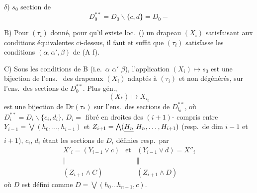 \documentclass[11pt,a4paper]{article}
\begin{document}
$\delta$) $s_0$ section de \struck{\ill{}}
\[
D_0^{**} = D_0 \smallsetminus \{c, d\} = D_0 - {}
\]
\ill{}


B) Pour $(\tau_i)$ donné, pour qu'il existe loc.\ (\ill{}) un drapeau $(X_i)$ satisfaisant aux conditions équivalentes ci-dessus, il faut et suffit que $(\tau_i)$ satisfasse les conditions $(\alpha, \alpha', \beta)$ de (A f).

C) Sous les conditions de B (i.e.\ $\alpha$ $\alpha'$ $\beta$), l'application $(X_i) \mapsto s_0$ est une bijection de l'ens.\   des drapeaux $(X_i)$ adaptés à $(\tau_i)$ et non dégénérés, sur l'ens.\ des sections de $D_0^{**}$. Plus gén.,  
\[
(X_*) \longmapsto X_{i_0}
\]
est une bijection de $\mathrm{Dr}(\tau_*)$ sur l'ens.\ des sections de $D_{i_0}^{**}$, où $D_i^{**} = D_i \smallsetminus \{c_i, d_i\}$, $D_i =$ fibré en droites des $(i+1)$- compris entre $Y_{i-1} = \bigvee(h_0, \dots, h_{i-1})$ et $Z_{i+1} = \bigwedge(\struck{H_n}\ H_n, \dots, H_{i+1})$ (resp.\ de dim $i-1$ et $i+1$), $c_i$, $d_i$ étant les sections de $D_i$ définies resp.\ par 
\[
\begin{array}{ccc}
X'_i = (Y_{i-1} \vee c) & \text{et} & (Y_{i-1} \vee d) = X''_i \\
\Vert & & \Vert \\
(Z_{i+1} \wedge C) & & (Z_{i+1} \wedge D)
\end{array}
\]
où $D$ est défini \ill{} comme $D = \bigvee(h_0 \dots h_{n-1}, c)$.
\end{document}
